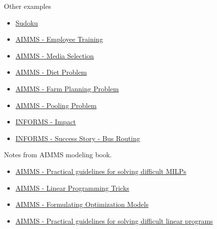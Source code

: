 \begin{resource}
{Other examples}
\begin{itemize}
\item \href{https://www.juliaopt.org/notebooks/JuMP-Sudoku.html}{Sudoku}
\item \href{https://download.aimms.com/aimms/download/manuals/AIMMS3OM_EmployeeTraining.pdf}{AIMMS - Employee Training}

\item \href{https://download.aimms.com/aimms/download/manuals/AIMMS3OM_MediaSelection.pdf}{AIMMS - Media Selection}

\item \href{https://download.aimms.com/aimms/download/manuals/AIMMS3OM_Diet.pdf}{AIMMS - Diet Problem}

\item \href{https://download.aimms.com/aimms/download/manuals/AIMMS3OM_FarmPlanning.pdf}{AIMMS - Farm Planning Problem}

\item \href{https://download.aimms.com/aimms/download/manuals/AIMMS3OM_Pooling.pdf}{AIMMS - Pooling Problem}

\item \href{https://www.informs.org/Impact}{INFORMS - Impact}
\item \href{https://www.informs.org/Impact/O.R.-Analytics-Success-Stories/Optimized-school-bus-routing-helps-school-districts-design-better-policies}{INFORMS - Success Story - Bus Routing}
\end{itemize}

{Notes from AIMMS modeling book.}
\begin{itemize}

\item \href{http://inside.mines.edu/~anewman/MIP_practice120212.pdf}{AIMMS - Practical guidelines for solving difficult MILPs}

\item \href{https://download.aimms.com/aimms/download/manuals/AIMMS3OM_LinearProgrammingTricks.pdf}{AIMMS - Linear Programming Tricks}


\item  \href{https://download.aimms.com/aimms/download/manuals/AIMMS3OM_FormulatingOptimizationModels.pdf}{AIMMS - Formulating Optimization Models}


\item \href{https://pdfs.semanticscholar.org/b01f/ad44c20c372fdda95cbfb980c0d37302de07.pdf}{AIMMS - Practical guidelines for solving difficult linear programs}
\end{itemize}


\end{resource}
